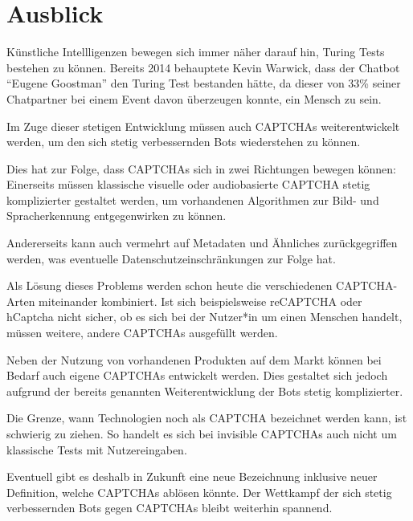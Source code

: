 \chapter{Ausblick}

Künstliche Intellligenzen bewegen sich immer näher darauf hin, Turing Tests bestehen zu können.
Bereits 2014 behauptete Kevin Warwick, dass der Chatbot ``Eugene Goostman'' den Turing Test bestanden hätte,
da dieser von 33\% seiner Chatpartner bei einem Event davon überzeugen konnte, ein Mensch zu sein. \cite{eugene}

Im Zuge dieser stetigen Entwicklung müssen auch CAPTCHAs weiterentwickelt werden,
um den sich stetig verbessernden Bots wiederstehen zu können. 

Dies hat zur Folge, dass CAPTCHAs sich in zwei Richtungen bewegen können:
Einerseits müssen klassische visuelle oder audiobasierte CAPTCHA stetig komplizierter gestaltet werden,
um vorhandenen Algorithmen zur Bild- und Spracherkennung entgegenwirken zu können.

Andererseits kann auch vermehrt auf Metadaten und Ähnliches zurückgegriffen werden, was eventuelle Datenschutzeinschränkungen zur Folge hat.

Als Lösung dieses Problems werden schon heute die verschiedenen CAP\-TCHA-Arten miteinander kombiniert.
Ist sich beispielsweise reCAPTCHA oder hCaptcha nicht sicher, ob es sich bei der Nutzer*in um einen Menschen handelt,
müssen weitere, andere CAPTCHAs ausgefüllt werden.

Neben der Nutzung von vorhandenen Produkten auf dem Markt können bei Bedarf auch eigene CAPTCHAs entwickelt werden.
Dies gestaltet sich jedoch aufgrund der bereits genannten Weiterentwicklung der Bots stetig komplizierter.

Die Grenze, wann Technologien noch als CAPTCHA bezeichnet werden kann, ist schwierig zu ziehen.
So handelt es sich bei invisible CAPTCHAs auch nicht um klassische Tests mit Nutzereingaben.

Eventuell gibt es deshalb in Zukunft eine neue Bezeichnung inklusive neuer Definition, welche CAPTCHAs ablösen könnte.
Der Wettkampf der sich stetig verbessernden Bots gegen CAPTCHAs bleibt weiterhin spannend.